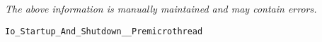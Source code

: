 \label{pkg:io\_startup\_and\_shutdown\_\_premicrothread}

{\tiny \it The above information is manually maintained and may contain errors.}
\begin{verbatim}
Io_Startup_And_Shutdown__Premicrothread
\end{verbatim}
